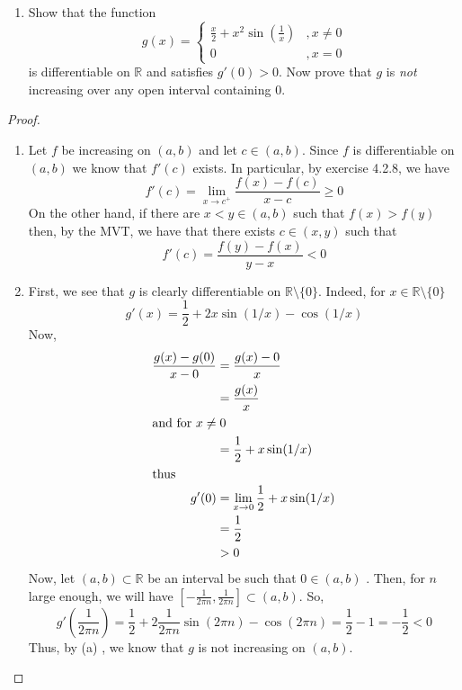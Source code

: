 \begin{enumerate}
\begin{enumerate}
\item Show that the function
\[
g(x) = \begin{cases} \frac{x}{2}+x^2\sin(\frac{1}{x}) &, x \neq 0 \\ 0 &, x=0 \end{cases}
\]
is differentiable on \( \mathbb{R} \) and satisfies \( g'(0)>0 \). Now prove that \( g \) is \emph{not} increasing over any open interval containing 0. 
\end{enumerate}
\begin{proof}
\begin{enumerate}
    \item Let \( f \) be increasing on \( (a,b) \) and let \( c \in (a,b) \). Since \( f \) is differentiable on \( (a,b) \) we know that \( f'(c) \) exists. In particular, by exercise 4.2.8, we have
    \[
        f'(c) = \lim_{x \rightarrow c^+} \frac{f(x)-f(c)}{x-c} \geq 0
    \]
    On the other hand, if there are \( x<y \in (a,b) \) such that \( f(x)>f(y) \) then, by the MVT, we have that there exists \( c \in (x,y) \) such that
    \[
    f'(c) = \frac{f(y)-f(x)}{y-x} < 0
    \]
    
    \item First, we see that \( g \) is clearly differentiable on \( \mathbb{R} \setminus \{ 0 \} \). Indeed, for \( x \in \mathbb{R} \setminus \{ 0 \} \)
    \[
    g'(x) = \frac{1}{2} + 2x \sin(1/x) - \cos(1/x)
    \]
    Now,
    \begin{align*}
        \frac{g(x) - g(0)}{x-0} &= \frac{g(x)-0}{x} \\
        &= \frac{g(x)}{x} \\
        \intertext{and for \( x \neq 0 \)}
        &= \frac{1}{2} + x \sin(1/x) \\
        \intertext{thus}
        g'(0) &= \lim_{x \rightarrow 0} \frac{1}{2} + x\sin(1/x) \\
        &= \frac{1}{2} \\
        &> 0
    \end{align*}
    Now, let \( (a,b) \subset \mathbb{R} \) be an interval be such that \( 0 \in (a,b) \) . Then, for \( n \) large enough, we will have \( \left[ -\frac{1}{2\pi n}, \frac{1}{2\pi n} \right] \subset (a,b) \). So, 
    \[
        g'\left( \frac{1}{2\pi n} \right) = \frac{1}{2} + 2 \frac{1}{2\pi n}\sin(2\pi n) - \cos(2\pi n) = \frac{1}{2} - 1 = -\frac{1}{2} < 0 
    \]
    Thus, by (a) , we know that \( g \) is not increasing on \( (a,b) \).
    
\end{enumerate}
\end{proof}


\end{enumerate}
